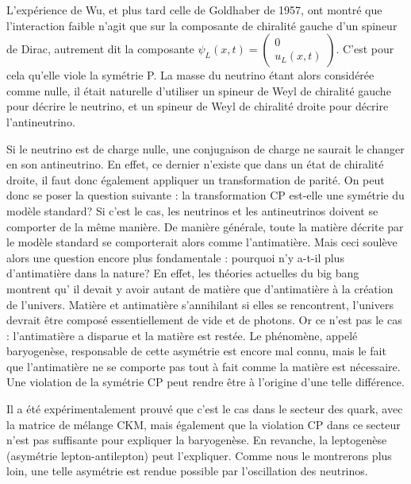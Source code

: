 			L'expérience de Wu, et plus tard celle de Goldhaber\cite{Goldhaber1958} de 1957, ont montré que l'interaction faible n'agit que sur la composante de chiralité gauche d'un spineur de Dirac, autrement dit la composante $\psi_L(x,t)=\left(\begin{matrix}0 \\ u_L(x,t)\end{matrix}\right)$. C'est pour cela qu'elle viole la symétrie P. La masse du neutrino étant alors considérée comme nulle, il était naturelle d'utiliser un spineur de Weyl de chiralité gauche pour décrire le neutrino, et un spineur de Weyl de chiralité droite pour décrire l'antineutrino.
			
			Si le neutrino est de charge nulle, une conjugaison de charge ne saurait le changer en son antineutrino. En effet, ce dernier n'existe que dans un état de chiralité droite, il faut donc également appliquer un transformation de parité. On peut donc se poser la question suivante : la transformation CP est-elle une symétrie du modèle standard? Si c'est le cas, les neutrinos et les antineutrinos doivent se comporter de la même manière. De manière générale, toute la matière décrite par le modèle standard se comporterait alors comme l'antimatière. Mais ceci soulève alors une question encore plus fondamentale : pourquoi n'y a-t-il plus d'antimatière dans la nature? En effet, les théories actuelles du big bang\cite{Canetti2012} montrent qu' il devait y avoir autant de matière que d'antimatière à la création de l'univers. Matière et antimatière s'annihilant si elles se rencontrent, l'univers devrait être composé essentiellement de vide et de photons. Or ce n'est pas le cas : l'antimatière a disparue et la matière est restée. Le phénomène, appelé baryogenèse, responsable de cette asymétrie est encore mal connu, mais le fait que l'antimatière ne se comporte pas tout à fait comme la matière est nécessaire\cite{Sakharov1991}. Une violation de la symétrie CP peut rendre être à l'origine d'une telle différence.
			
			Il a été expérimentalement prouvé que c'est le cas dans le secteur des quark\cite{Collaboration2006,Charles2004,Kobayashi1973}, avec la matrice de mélange CKM, mais également que la violation CP dans ce secteur n'est pas suffisante pour expliquer la baryogenèse\cite{Riotto1998}. En revanche, la leptogenèse (asymétrie lepton-antilepton) peut l'expliquer\cite{Davidson2008}. Comme nous le montrerons plus loin, une telle asymétrie est rendue possible par l'oscillation des neutrinos.
        
